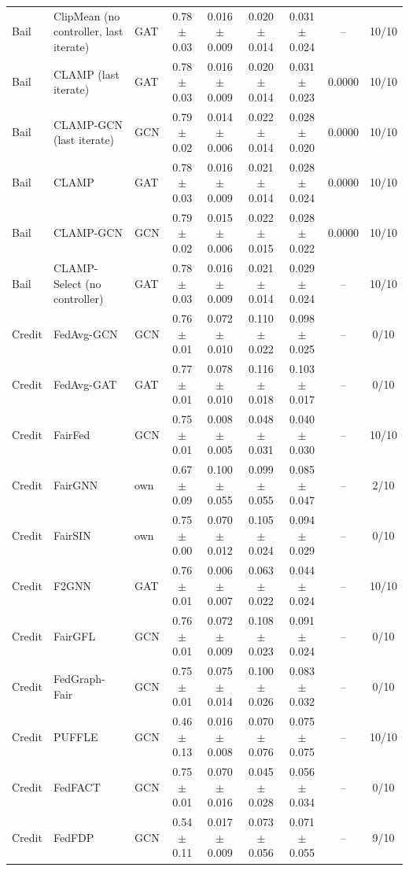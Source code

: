\begin{longtable}{lp{2.2cm}lcccccc}
Bail & ClipMean (no controller, last iterate) & GAT & 0.78$\pm$0.03 & 0.016$\pm$0.009 & 0.020$\pm$0.014 & 0.031$\pm$0.024 & -- & 10/10 \\
Bail & CLAMP (last iterate) & GAT & 0.78$\pm$0.03 & 0.016$\pm$0.009 & 0.020$\pm$0.014 & 0.031$\pm$0.023 & 0.0000 & 10/10 \\
Bail & CLAMP-GCN (last iterate) & GCN & 0.79$\pm$0.02 & 0.014$\pm$0.006 & 0.022$\pm$0.014 & 0.028$\pm$0.020 & 0.0000 & 10/10 \\
Bail & CLAMP & GAT & 0.78$\pm$0.03 & 0.016$\pm$0.009 & 0.021$\pm$0.014 & 0.028$\pm$0.024 & 0.0000 & 10/10 \\
Bail & CLAMP-GCN & GCN & 0.79$\pm$0.02 & 0.015$\pm$0.006 & 0.022$\pm$0.015 & 0.028$\pm$0.022 & 0.0000 & 10/10 \\
Bail & CLAMP-Select (no controller) & GAT & 0.78$\pm$0.03 & 0.016$\pm$0.009 & 0.021$\pm$0.014 & 0.029$\pm$0.024 & -- & 10/10 \\
Credit & FedAvg-GCN & GCN & 0.76$\pm$0.01 & 0.072$\pm$0.010 & 0.110$\pm$0.022 & 0.098$\pm$0.025 & -- & 0/10 \\
Credit & FedAvg-GAT & GAT & 0.77$\pm$0.01 & 0.078$\pm$0.010 & 0.116$\pm$0.018 & 0.103$\pm$0.017 & -- & 0/10 \\
Credit & FairFed & GCN & 0.75$\pm$0.01 & 0.008$\pm$0.005 & 0.048$\pm$0.031 & 0.040$\pm$0.030 & -- & 10/10 \\
Credit & FairGNN & own & 0.67$\pm$0.09 & 0.100$\pm$0.055 & 0.099$\pm$0.055 & 0.085$\pm$0.047 & -- & 2/10 \\
Credit & FairSIN & own & 0.75$\pm$0.00 & 0.070$\pm$0.012 & 0.105$\pm$0.024 & 0.094$\pm$0.029 & -- & 0/10 \\
Credit & F2GNN & GAT & 0.76$\pm$0.01 & 0.006$\pm$0.007 & 0.063$\pm$0.022 & 0.044$\pm$0.024 & -- & 10/10 \\
Credit & FairGFL & GCN & 0.76$\pm$0.01 & 0.072$\pm$0.009 & 0.108$\pm$0.023 & 0.091$\pm$0.024 & -- & 0/10 \\
Credit & FedGraph-Fair & GCN & 0.75$\pm$0.01 & 0.075$\pm$0.014 & 0.100$\pm$0.026 & 0.083$\pm$0.032 & -- & 0/10 \\
Credit & PUFFLE & GCN & 0.46$\pm$0.13 & 0.016$\pm$0.008 & 0.070$\pm$0.076 & 0.075$\pm$0.075 & -- & 10/10 \\
Credit & FedFACT & GCN & 0.75$\pm$0.01 & 0.070$\pm$0.016 & 0.045$\pm$0.028 & 0.056$\pm$0.034 & -- & 0/10 \\
Credit & FedFDP & GCN & 0.54$\pm$0.11 & 0.017$\pm$0.009 & 0.073$\pm$0.056 & 0.071$\pm$0.055 & -- & 9/10 \\

\end{longtable}
